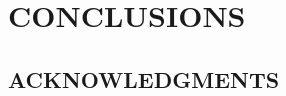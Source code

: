 \documentclass[12pt]{article}
\begin{document}
\section*{\sffamily \Large CONCLUSIONS}


\subsection*{\sffamily \large ACKNOWLEDGMENTS}




\clearpage



%
%


\end{document}
